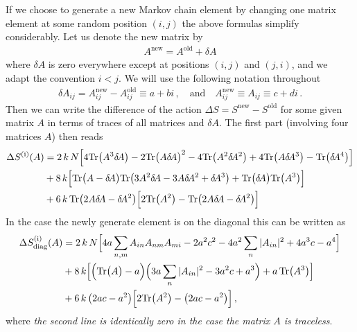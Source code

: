 \documentclass[10pt,a4paper]{article}
\newcommand{\RN}[1]{%
    \textup{\uppercase\expandafter{\romannumeral#1}}%
}
\newcommand{\Tr}{\mathrm{Tr}\vspace{-2pt}}
\newcommand{\deltaA}{\delta \! A}
\begin{document}
If we choose to generate a new Markov chain element by changing one
matrix element at some random position $(i,j)$ the above formulas simplify considerably.
Let us denote the new matrix by
\begin{align}
  A^{\mathrm{new}} = A^{\mathrm{old}} + \deltaA
\end{align}
where $\deltaA$ is zero everywhere except at positions $(i,j)$ and
$(j,i)$, and we adapt the convention $i<j$.
We will use the following notation throughout
\begin{align}
  \deltaA_{ij} = A_{ij}^{\mathrm{new}} - A_{ij}^{\mathrm{old}} \equiv a + bi \,,
  \quad \text{and} \quad
  A^{\mathrm{new}}_{ij} \equiv A_{ij} \equiv c + di \,.
\end{align}
Then we can write the difference of the action $\Delta S = S^{\mathrm{new}}
- S^{\mathrm{old}}$ for some given matrix $A$ in terms of traces of
all matrices and $\deltaA$.
The first part (involving four matrices $A$) then reads
\begin{align}
  \Delta S^{(\RN 1)} (A) &=
  2 \, k \, N
  \Big[
      4 \Tr \big( A^3 \deltaA   \big)
    - 2 \Tr \big( A   \deltaA   \big)^2
    - 4 \Tr \big( A^2 \deltaA^2 \big)
    + 4 \Tr \big( A   \deltaA^3 \big)
    -   \Tr \big(     \deltaA^4 \big)
  \Big]
  \nonumber \\
  &+ 8 \, k
  \Big[
    \Tr \big( A - \deltaA \big) \Tr \big( 3 A^2 \deltaA - 3 A \deltaA^2 + \deltaA^3 \big)
    + \Tr \big( \deltaA \big) \Tr \big( A^3 \big)
  \Big]
  \nonumber \\
  &+ 6  \, k  \, \Tr \big( 2 A \deltaA - \deltaA^2 \big)
  \Big[
    2 \Tr \big( A^2 \big)
    - \Tr \big( 2 A \deltaA - \deltaA^2 \big)
  \Big]
\end{align}
In the case the newly generate element is on the diagonal this can be written as
\begin{align}
  \Delta S^{(\RN{1})}_{\mathrm{diag}} (A) &=
    2 \, k \, N
    \Big[
      4 a \sum_{n,m} A_{in} A_{nm} A_{mi}
      - 2 a^2 c^2
      - 4 a^2 \sum_n |A_{in}|^2
      + 4 a^3 c
      - a^4
  \Big]
  \nonumber \\
  &+8 \, k
  \Big[
    \Big( \Tr \big( A \big) - a \Big)
    \Big(
      3 a \sum_n |A_{in}|^2
      - 3 a^2 c
      + a^3
    \Big)
    + a \, \Tr \big( A^3 \big)
  \Big]
  \nonumber \\
  &+6 \, k \, \big( 2 a c - a^2 \big)
  \Big[
    2 \Tr \big( A^2 \big)
    - \big( 2 a c - a^2 \big)
  \Big]
 \,,
\end{align}
where
\textit{the second line is identically zero in the case the matrix $A$ is traceless}.
\end{document}
